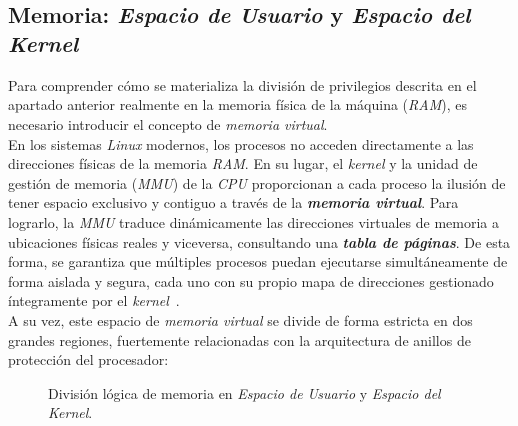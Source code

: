 \

\

\subsection{Memoria: \textit{Espacio de Usuario} y \textit{Espacio del Kernel}}
\label{sec:uskrspaces}

Para comprender cómo se materializa la división de privilegios descrita en el apartado anterior realmente en la memoria física de la máquina (\textit{RAM}), es necesario introducir el concepto de \textit{memoria virtual}.\\

En los sistemas \textit{Linux} modernos, los procesos no acceden directamente a las direcciones físicas de la memoria \textit{RAM}.
En su lugar, el \textit{kernel} y la unidad de gestión de memoria (\textit{MMU}) de la \textit{CPU} proporcionan a cada proceso la ilusión de tener espacio exclusivo y contiguo a través de la \textbf{\textit{memoria virtual}}.
Para lograrlo, la \textit{MMU} traduce dinámicamente las direcciones virtuales de memoria a ubicaciones físicas reales y viceversa, consultando una \textbf{\textit{tabla de páginas}}.
De esta forma, se garantiza que múltiples procesos puedan ejecutarse simultáneamente de forma aislada y segura, cada uno con su propio mapa de direcciones gestionado íntegramente por el \textit{kernel}~\cite{silberschatz_memoria}.\\

A su vez, este espacio de \textit{memoria virtual} se divide de forma estricta en dos grandes regiones, fuertemente relacionadas con la arquitectura de anillos de protección del procesador:

\begin{figure}[h!]
  \centering
  \scalebox{0.65}{}
  \caption{División lógica de memoria en \textit{Espacio de Usuario} y \textit{Espacio del Kernel}.}
  \label{fig:usr_krn_memory}
\end{figure}

